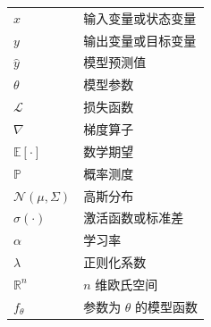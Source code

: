 \begin{symboldescription}
	\noindent\begin{tabularx}{\textwidth}{X X}
		\(x\) & 输入变量或状态变量 \\
		\(y\) & 输出变量或目标变量 \\
		\(\hat{y}\) & 模型预测值 \\
		\(\theta\) & 模型参数 \\
		\(\mathcal{L}\) & 损失函数 \\
		\(\nabla\) & 梯度算子 \\
		\(\mathbb{E}[\cdot]\) & 数学期望 \\
		\(\mathbb{P}\) & 概率测度 \\
		\(\mathcal{N}(\mu, \Sigma)\) & 高斯分布 \\
		\(\sigma(\cdot)\) & 激活函数或标准差 \\
		\(\alpha\) & 学习率 \\
		\(\lambda\) & 正则化系数 \\
		\(\mathbb{R}^n\) & \(n\) 维欧氏空间 \\
		\(f_\theta\) & 参数为 \(\theta\) 的模型函数 \\
	\end{tabularx}
\end{symboldescription}
